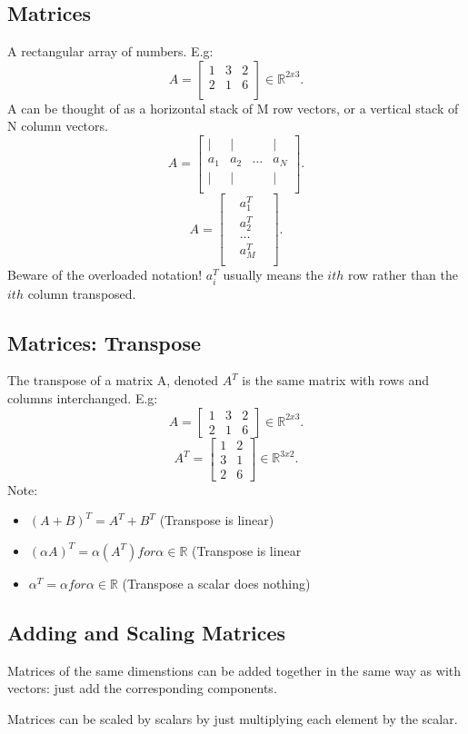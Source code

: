 \documentclass[a4paper]{article}
\newcommand{\R}{\mathbb{R}}
\newcommand{\0}{\mathbb{\emptyset}}
\begin{document}
	\subsection{Matrices}
	A rectangular array of numbers. E.g:
	\[
	A=\begin{bmatrix} 1 & 3 & 2 \\
		2 & 1 & 6 \\
	\end{bmatrix} \in \R^{2x3}
	.\] 
	A can be thought of as a horizontal stack of M row vectors, or a vertical stack of N
	column vectors.
	\[
		A=
		\begin{bmatrix}  
			\mid &  \mid & & \mid  \\
			a_1 & a_2 & \ldots & a_N \\
			\mid &  \mid & &  \mid \\
		\end{bmatrix}
	.\]\[
		A=
		\begin{bmatrix} 
			 & a_1^T &  \\
			 & a_2^T &  \\
			       & \ldots & \\
			 & a_M^T &  \\
		\end{bmatrix} 
	.\] 
	Beware of the overloaded notation! $a_i^T$ usually means the $ith$ row rather than the $ith$
	column transposed.
	\subsection{Matrices: Transpose}
	The transpose of a matrix A, denoted $A^T$ is the same matrix with rows
	and columns interchanged. E.g:
	 \[
		 A=\begin{bmatrix} 1 & 3 & 2 \\
		 2 & 1 & 6\end{bmatrix} \in \R^{2x3}
	.\] 
	\[
		A^T= \begin{bmatrix} 1 & 2 \\
		3 & 1 \\
		2 & 6\end{bmatrix} \in \R^{3x2} 
	.\] 
	Note:
	\begin{itemize}
		\item $(A+B)^T=A^T+B^T$ (Transpose is linear)
		\item $(\alpha A)^T=\alpha(A^T) for \alpha \in \R$ (Transpose is
			linear
		\item $\alpha^T = \alpha for \alpha \in \R$ (Transpose a scalar
			does nothing)
	\end{itemize}
	\subsection{Adding and Scaling Matrices}
	Matrices of the same dimenstions can be added together in the same way
	as with vectors: just add the corresponding components. \par
	Matrices can be scaled by scalars by just multiplying each element by
	the scalar.
\end{document}

